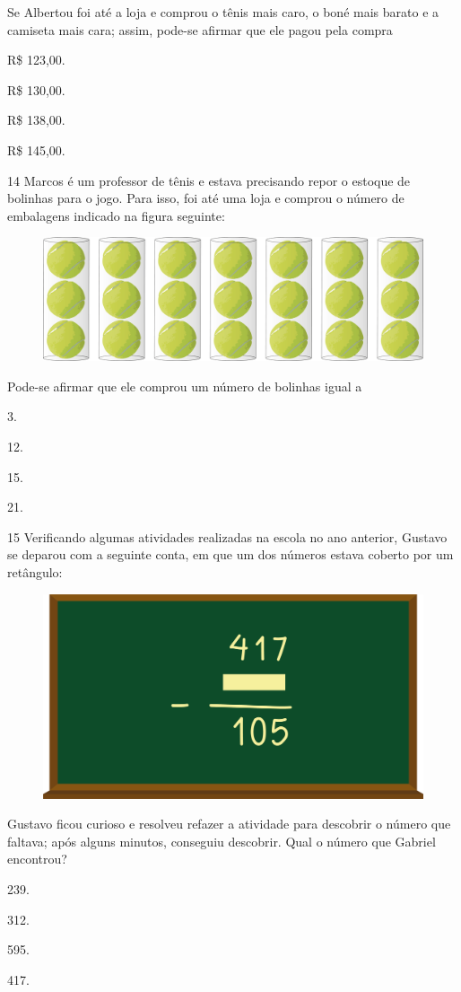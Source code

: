 Se Albertou foi até a loja e comprou o tênis mais caro, o boné mais barato e a camiseta mais cara; assim, pode-se afirmar que ele pagou pela compra

\begin{escolha}
\item
  R\$ 123,00.
\item
  R\$ 130,00.
\item
  R\$ 138,00.
\item
  R\$ 145,00.
\end{escolha}


\pagebreak
\num{14} Marcos é um professor de tênis e estava precisando repor o estoque de bolinhas para o jogo. Para isso, foi até uma loja e comprou o número de embalagens indicado na figura seguinte:

\begin{figure}[htpb!]
\centering
\includegraphics[width=.8\textwidth]{./media/image121.png}
\end{figure}

Pode-se afirmar que ele comprou um número de bolinhas igual a

\begin{multicols}{2}
\begin{escolha}
\item
  3.
\item
  12.
\item
  15.
\item
  21.
\end{escolha}
\end{multicols}


\num{15} Verificando algumas atividades realizadas na escola no ano anterior, Gustavo se deparou com a seguinte conta, em que um dos números estava
coberto por um retângulo:

\begin{figure}[htpb!]
\centering  
\includegraphics[width=.5\textwidth]{./media/image122.png}
\end{figure}

Gustavo ficou curioso e resolveu refazer a atividade para descobrir o número que faltava; após alguns minutos, conseguiu descobrir. Qual o número que Gabriel encontrou?

\begin{multicols}{2}
\begin{escolha}
\item
  239.
\item
  312.
\item
  595.
\item
  417.
\end{escolha}
\end{multicols}



